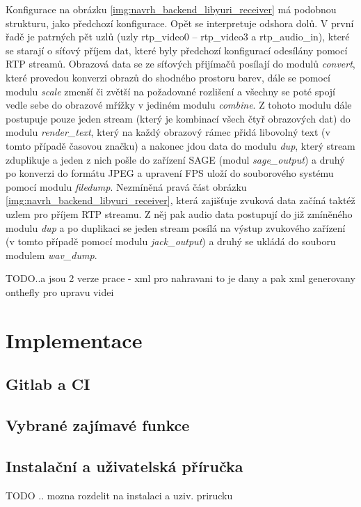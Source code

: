 \documentclass[thesis=M,czech]{FITthesis}[2012/06/26]
\begin{document}
Konfigurace na obrázku \ref{img:navrh_backend_libyuri_receiver} má podobnou strukturu, jako předchozí konfigurace. Opět se interpretuje odshora dolů. V první řadě je patrných pět uzlů (uzly rtp\_video0 -- rtp\_video3 a rtp\_audio\_in), které se starají o síťový příjem dat, které byly předchozí konfigurací odesílány pomocí RTP streamů. Obrazová data se ze síťových přijímačů posílají do modulů \textit{convert}, které provedou konverzi obrazů do shodného prostoru barev, dále se pomocí modulu \textit{scale} zmenší či zvětší na požadované rozlišení a všechny se poté spojí vedle sebe do obrazové mřížky v jediném modulu \textit{combine}. Z tohoto modulu dále postupuje pouze jeden stream (který je kombinací všech čtyř obrazových dat) do modulu \textit{render\_text}, který na každý obrazový rámec přidá libovolný text (v tomto případě časovou značku) a nakonec jdou data do modulu \textit{dup}, který stream zduplikuje a jeden z nich pošle do zařízení SAGE (modul \textit{sage\_output}) a druhý po konverzi do formátu JPEG a upravení FPS uloží do souborového systému pomocí modulu \textit{filedump}. Nezmíněná pravá část obrázku \ref{img:navrh_backend_libyuri_receiver}, která zajišťuje zvuková data začíná taktéž uzlem pro příjem RTP streamu. Z něj pak audio data postupují do již zmíněného modulu \textit{dup} a po duplikaci se jeden stream posílá na výstup zvukového zařízení (v tomto případě pomocí modulu \textit{jack\_output}) a druhý se ukládá do souboru modulem \textit{wav\_dump}.


TODO..a jsou 2 verze prace - xml  pro nahravani to je dany a pak xml generovany onthefly pro upravu videi


\chapter{Implementace} \label{chap:impl}
\section{Gitlab a CI} \label{sec:impl_gitlab}

\section{Vybrané zajímavé funkce} \label{sec:impl_funkce}

\section{Instalační a uživatelská příručka} \label{sec:impl_prirucka}
TODO .. mozna rozdelit na instalaci a uziv. prirucku
\end{document}
